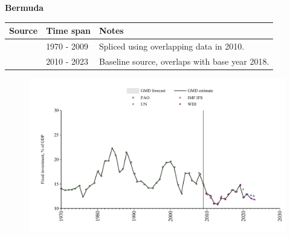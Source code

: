 \documentclass[12pt,a4paper,landscape]{article}
\begin{document}
\begin{adjustbox}{max totalsize={\paperwidth}{\paperheight},center}
\begin{minipage}[t][\textheight][t]{\textwidth}
\vspace*{0.5cm}
{}
\begin{center}
{\Large\bfseries Bermuda}
\end{center}
\vspace{0.5cm}
\begin{table}[H]
\centering
\small
\begin{tabular}{|l|l|l|}
\hline
\textbf{Source} & \textbf{Time span} & \textbf{Notes} \\
\hline
\rowcolor{white}\cite{UN}& 1970 - 2009 &Spliced using overlapping data in 2010.\\
\rowcolor{lightgray}\cite{WDI}& 2010 - 2023 &Baseline source, overlaps with base year 2018.\\
\hline
\end{tabular}
\end{table}
\begin{figure}[H]
\centering
\includegraphics[width=\textwidth,height=0.6\textheight,keepaspectratio]{graphs/BMU_finv_GDP.pdf}
\end{figure}
\end{minipage}
\end{adjustbox}
\end{document}

